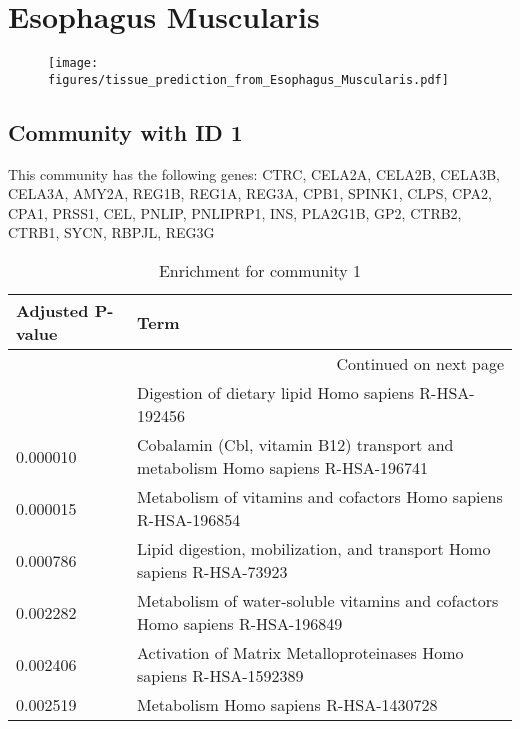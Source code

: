 
\section*{Esophagus Muscularis}
\begin{figure}[h!]
\centering
\texttt{[image: figures/tissue\_prediction\_from\_Esophagus\_Muscularis.pdf]}
\end{figure}



\subsection*{Community with ID 1}
This community has the following genes: CTRC, CELA2A, CELA2B, CELA3B, CELA3A, AMY2A, REG1B, REG1A, REG3A, CPB1, SPINK1, CLPS, CPA2, CPA1, PRSS1, CEL, PNLIP, PNLIPRP1, INS, PLA2G1B, GP2, CTRB2, CTRB1, SYCN, RBPJL, REG3G
\\
\begin{longtable}{p{2.4cm}p{14.5cm}}
\caption{Enrichment for community 1}\\
\toprule
Adjusted \newline P-value &                                                                             Term \\
\midrule
\endhead
\midrule
\multicolumn{2}{r}{{Continued on next page}} \\
\midrule
\endfoot

\bottomrule
\endlastfoot
                 0.000008 &                             Digestion of dietary lipid Homo sapiens R-HSA-192456 \\
                 0.000010 &  Cobalamin (Cbl, vitamin B12) transport and metabolism Homo sapiens R-HSA-196741 \\
                 0.000015 &                   Metabolism of vitamins and cofactors Homo sapiens R-HSA-196854 \\
                 0.000786 &            Lipid digestion, mobilization, and transport Homo sapiens R-HSA-73923 \\
                 0.002282 &     Metabolism of water-soluble vitamins and cofactors Homo sapiens R-HSA-196849 \\
                 0.002406 &               Activation of Matrix Metalloproteinases Homo sapiens R-HSA-1592389 \\
                 0.002519 &                                            Metabolism Homo sapiens R-HSA-1430728 \\
\end{longtable}


